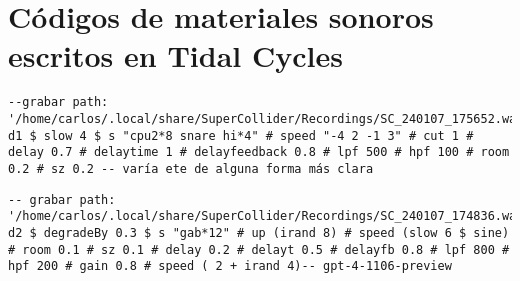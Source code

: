 \section*{Códigos de materiales sonoros escritos en Tidal Cycles}



\begin{minipage}[t]{1\textwidth}
    \centering
    \begin{lstlisting}[style=SuperCollider-IDE, basicstyle=\footnotesize\ttfamily, numbers=none]
--grabar path: '/home/carlos/.local/share/SuperCollider/Recordings/SC_240107_175652.wav'
d1 $ slow 4 $ s "cpu2*8 snare hi*4" # speed "-4 2 -1 3" # cut 1 # delay 0.7 # delaytime 1 # delayfeedback 0.8 # lpf 500 # hpf 100 # room 0.2 # sz 0.2 -- varía ete de alguna forma más clara                                        
    \end{lstlisting}
    \vspace{1cm}
\end{minipage}





\begin{minipage}[t]{1\textwidth}
    \centering
    \begin{lstlisting}[style=SuperCollider-IDE, basicstyle=\footnotesize\ttfamily, numbers=none]
-- grabar path: '/home/carlos/.local/share/SuperCollider/Recordings/SC_240107_174836.wav'
d2 $ degradeBy 0.3 $ s "gab*12" # up (irand 8) # speed (slow 6 $ sine) # room 0.1 # sz 0.1 # delay 0.2 # delayt 0.5 # delayfb 0.8 # lpf 800 # hpf 200 # gain 0.8 # speed ( 2 + irand 4)-- gpt-4-1106-preview                                   
    \end{lstlisting}
    \vspace{1cm}
\end{minipage}








